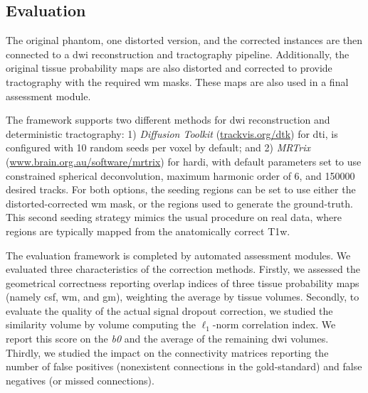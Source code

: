 \subsection{Evaluation}
\label{sec:evaluation}
The original phantom, one distorted version, and the corrected instances are then connected to a
  \gls*{dwi} reconstruction and tractography pipeline.
Additionally, the original tissue probability maps are also distorted and corrected to provide
  tractography with the required \gls*{wm} masks.
These maps are also used in a final assessment module.

The framework supports two different methods for \gls*{dwi} reconstruction and deterministic
  tractography:
1) \emph{Diffusion Toolkit} (\url{trackvis.org/dtk}) %
  for \gls*{dti}, is configured with 10 random seeds per voxel by default; and
2) \emph{MRTrix} %
  (\url{www.brain.org.au/software/mrtrix}) for \gls*{hardi}, with default parameters
  set to use constrained spherical deconvolution, maximum harmonic order of 6, and
  150000 desired tracks.
For both options, the seeding regions can be set to use either the distorted-corrected 
  \gls*{wm} mask, or the regions used to generate the ground-truth.
This second seeding strategy mimics the usual procedure on real data,
  where regions are typically mapped from the anatomically correct T1w.

The evaluation framework is completed by automated assessment modules.
We evaluated three characteristics of the correction methods.
Firstly, we assessed the geometrical correctness reporting overlap indices of three tissue
  probability maps (namely \gls*{csf}, \gls*{wm}, and \gls*{gm}), weighting the average by
  tissue volumes.
Secondly, to evaluate the quality of the actual signal dropout correction, we studied the 
  similarity volume by volume computing the $\ell_1$-norm correlation index.
We report this score on the \textit{b0} and the average of the remaining \gls*{dwi} volumes.
Thirdly, we studied the impact on the connectivity matrices reporting the number of 
  false positives (nonexistent connections in the gold-standard) and false negatives 
  (or missed connections).